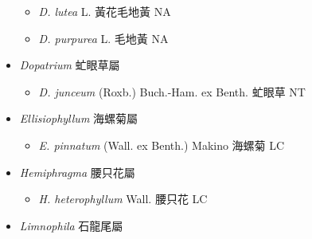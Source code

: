 \begin{itemize}
  \begin{itemize}
        \item[] \textit{D. lutea} L.  黃花毛地黃   NA
        \item[] \textit{D. purpurea} L.  毛地黃   NA
  \end{itemize}
 \item[] \textit{Dopatrium} 虻眼草屬
                                
  \begin{itemize}
        \item[] \textit{D. junceum} (Roxb.) Buch.-Ham. ex Benth.  虻眼草   NT
  \end{itemize}
 \item[] \textit{Ellisiophyllum} 海螺菊屬
                                
  \begin{itemize}
        \item[] \textit{E. pinnatum} (Wall. ex Benth.) Makino  海螺菊   LC
  \end{itemize}
 \item[] \textit{Hemiphragma} 腰只花屬
                                
  \begin{itemize}
        \item[] \textit{H. heterophyllum} Wall.  腰只花   LC
  \end{itemize}
 \item[] \textit{Limnophila} 石龍尾屬
                                

\end{itemize}
